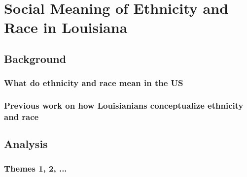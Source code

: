 \chapter{Social Meaning of Ethnicity and Race in Louisiana}
  \section{Background}
    \subsection{What do ethnicity and race mean in the US}
    \subsection{Previous work on how Louisianians conceptualize ethnicity and race}
  \section{Analysis}
    \subsection{Themes 1, 2, ...}

